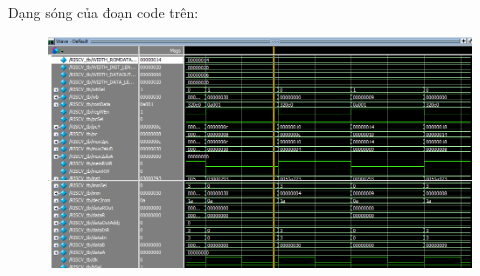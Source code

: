 \documentclass[E:/Latex/ExtraWork/ComputerArchitechture/Report.tex]{subfiles}
\begin{document}
\begin{otherlanguage}{english}
\begin{itemize}
					Dạng sóng của đoạn code trên:
					\begin{figure}[h!]
						\includegraphics[scale = 0.6]{Figure/Fig7.png}
						\centering
					\end{figure}

			\end{itemize}

	\end{otherlanguage}
\end{document}
